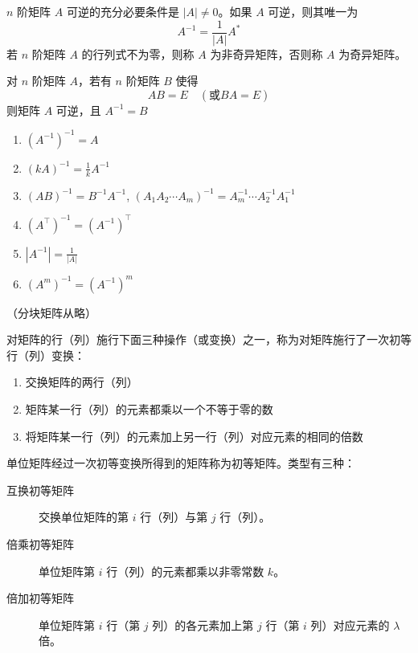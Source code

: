 \documentclass{ctexbook}
\begin{document}
\begin{theorem}[可逆，非奇异矩阵]
    $n$ 阶矩阵 $A$ 可逆的充分必要条件是 $|A|\neq 0$。如果 $A$ 可逆，则其唯一为
    \begin{equation}
        A^{-1}=\frac{1}{|A|}A^*
    \end{equation}
    若 $n$ 阶矩阵 $A$ 的行列式不为零，则称 $A$ 为非奇异矩阵，否则称 $A$ 为奇异矩阵。
\end{theorem}

\begin{corollary}[可逆，存在乘数]
    对 $n$ 阶矩阵 $A$，若有 $n$ 阶矩阵 $B$ 使得
    \begin{equation}
        AB=E \quad (\text{或} BA=E)
    \end{equation}
    则矩阵 $A$ 可逆，且 $A^{-1}=B$
\end{corollary}

\begin{proposition}[可逆矩阵的性质]
    \begin{enumerate}
        \item $(A^{-1})^{-1}=A$
        \item $(kA)^{-1}=\frac{1}{k}A^{-1}$
        \item $(AB)^{-1}=B^{-1}A^{-1}$, $(A_1A_2\cdots A_m)^{-1}=A_m^{-1}\cdots A_2^{-1}A_1^{-1}$
        \item $(A^\top)^{-1}=(A^{-1})^\top$
        \item $|A^{-1}|=\frac{1}{|A|}$
        \item $(A^m)^{-1}=(A^{-1})^m$
    \end{enumerate}
\end{proposition}

（分块矩阵从略）

\begin{definition}[矩阵的初等变换]
    对矩阵的行（列）施行下面三种操作（或变换）之一，称为对矩阵施行了一次初等行（列）变换：
    \begin{enumerate}
        \item 交换矩阵的两行（列）
        \item 矩阵某一行（列）的元素都乘以一个不等于零的数
        \item 将矩阵某一行（列）的元素加上另一行（列）对应元素的相同的倍数
    \end{enumerate}
\end{definition}

\begin{definition}[初等矩阵]
    单位矩阵经过一次初等变换所得到的矩阵称为初等矩阵。类型有三种：
    \begin{description}
        \item[互换初等矩阵] 交换单位矩阵的第 $i$ 行（列）与第 $j$ 行（列）。
        \item[倍乘初等矩阵] 单位矩阵第 $i$ 行（列）的元素都乘以非零常数 $k$。
        \item[倍加初等矩阵] 单位矩阵第 $i$ 行（第 $j$ 列）的各元素加上第 $j$ 行（第 $i$ 列）对应元素的 $\lambda$ 倍。
    \end{description}
\end{definition}
\end{document}
